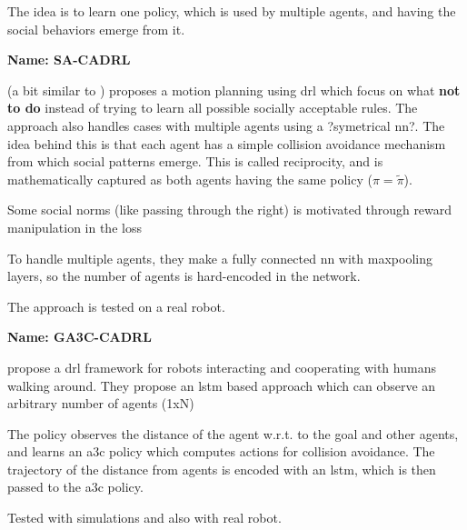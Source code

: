 The idea is to learn one policy, which is used by multiple agents, and having the social behaviors emerge from it.



\textbf{Name: SA-CADRL}

\cite{chen2017socially} (a bit similar to \cite{chen2017decentralized}) proposes a motion planning using \gls{drl} which focus on what \textbf{not to do} instead of trying to learn all possible socially acceptable rules.
%
The approach also handles cases with multiple agents using a ?symetrical \gls{nn}?.
%
The idea behind this is that each agent has a simple collision avoidance mechanism from which social patterns emerge.
%
This is called reciprocity, and is mathematically captured as both agents having the same policy ($\pi = \tilde{\pi}$).

Some social norms (like passing through the right) is motivated through reward manipulation in the loss 

To handle multiple agents, they make a fully connected \gls{nn} with maxpooling layers, so the number of agents is hard-encoded in the network.

The approach is tested on a real robot.




\textbf{Name: GA3C-CADRL}

\cite{everett2018motion} propose a \gls{drl} framework for robots interacting and cooperating with humans walking around.
%
They propose an \gls{lstm} based approach which can observe an arbitrary number of agents (1xN)

The policy observes the distance of the agent w.r.t. to the goal and other agents, and learns an \gls{a3c} policy which computes actions for collision avoidance.
%
The trajectory of the distance from agents is encoded with an \gls{lstm}, which is then passed to the \gls{a3c} policy.

Tested with simulations and also with real robot.


